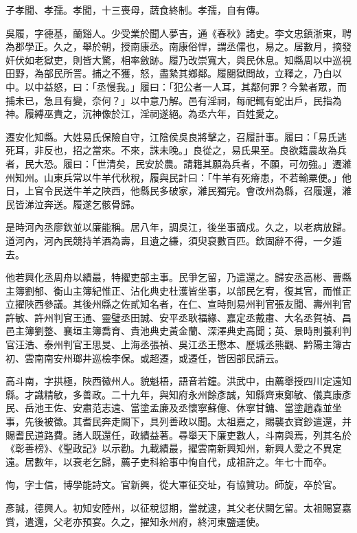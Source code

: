 \begin{pinyinscope}
子孝聞、孝孺。孝聞，十三喪母，蔬食終制。孝孺，自有傳。

吳履，字德基，蘭谿人。少受業於聞人夢吉，通《春秋》諸史。李文忠鎮浙東，聘為郡學正。久之，舉於朝，授南康丞。南康俗悍，謂丞儒也，易之。居數月，摘發奸伏如老獄吏，則皆大驚，相率斂跡。履乃改崇寬大，與民休息。知縣周以中巡視田野，為部民所詈。捕之不獲，怒，盡縶其鄉鄰。履閱獄問故，立釋之，乃白以中。以中益怒，曰：「丞慢我。」履曰：「犯公者一人耳，其鄰何罪？今縶者眾，而捕未已，急且有變，奈何？」以中意乃解。邑有淫祠，每祀輒有蛇出戶，民指為神。履縛巫責之，沉神像於江，淫祠遂絕。為丞六年，百姓愛之。

遷安化知縣。大姓易氏保險自守，江陰侯吳良將擊之，召履計事。履曰：「易氏逃死耳，非反也，招之當來。不來，誅未晚。」良從之，易氏果至。良欲籍農故為兵者，民大恐。履曰：「世清矣，民安於農。請籍其願為兵者，不願，可勿強。」遷濰州知州。山東兵常以牛羊代秋稅，履與民計曰：「牛羊有死瘠患，不若輸粟便。」他日，上官令民送牛羊之陜西，他縣民多破家，濰民獨完。會改州為縣，召履還，濰民皆涕泣奔送。履遂乞骸骨歸。

是時河內丞廖欽並以廉能稱。居八年，調吳江，後坐事謫戍。久之，以老病放歸。道河內，河內民競持羊酒為壽，且遺之縑，須臾裒數百匹。欽固辭不得，一夕遁去。

他若興化丞周舟以績最，特擢吏部主事。民爭乞留，乃遣還之。歸安丞高彬、曹縣主簿劉郁、衡山主簿紀惟正、沾化典史杜濩皆坐事，以部民乞宥，復其官，而惟正立擢陜西參議。其後州縣之佐貳知名者，在仁、宣時則易州判官張友聞、壽州判官許敏、許州判官王通、靈璧丞田誠、安平丞耿福緣、嘉定丞戴肅、大名丞賀禎、昌邑主簿劉整、襄垣主簿喬育、貴池典史黃金蘭、深澤典史高聞；英、景時則養利判官汪浩、泰州判官王思旻、上海丞張禎、吳江丞王懋本、歷城丞熊觀、黔陽主簿古初、雲南南安州瑯井巡檢李保。或超遷，或遷任，皆因部民請云。

高斗南，字拱極，陜西徽州人。貌魁梧，語音若鐘。洪武中，由薦舉授四川定遠知縣。才識精敏，多善政。二十九年，與知府永州餘彥誠，知縣齊東鄭敏、儀真康彥民、岳池王佐、安肅范志遠、當塗孟廉及丞懷寧蘇億、休寧甘鏞、當塗趙森並坐事，先後被徵。其耆民奔走闕下，具列善政以聞。太祖嘉之，賜襲衣寶鈔遣還，并賜耆民道路費。諸人既還任，政績益著。尋舉天下廉吏數人，斗南與焉，列其名於《彰善榜》、《聖政記》以示勸。九載績最，擢雲南新興知州，新興人愛之不異定遠。居數年，以衰老乞歸，薦子吏科給事中恂自代，成祖許之。年七十而卒。

恂，字士信，博學能詩文。官新興，從大軍征交址，有協贊功。師旋，卒於官。

彥誠，德興人。初知安陸州，以征稅愆期，當就逮，其父老伏闕乞留。太祖賜宴嘉賞，遣還，父老亦預宴。久之，擢知永州府，終河東鹽運使。


\end{pinyinscope}
